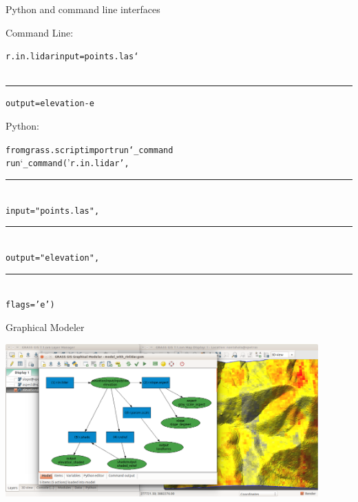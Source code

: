 \documentclass[xcolor={dvipsnames,usenames},beamer,aspectratio=169]{beamer}
\begin{document}
\begin{frame}{Python and command line interfaces}


\Large

Command Line:

\LARGE

\begin{alltt}
\textcolor{mod}{r.in.lidar} \textcolor{opt}{input}=\textcolor{txt}{points.las} \textcolor{bash}{\char`\\}
\\%
\newlength{\shindent}
\settowidth{\shindent}{r.in.lidar~}
\rule{\shindent}{0pt}%
\textcolor{opt}{output}=\textcolor{txt}{elevation} -\textcolor{flg}{e}
\end{alltt}

\Large

Python:


\LARGE

\begin{alltt}
\textcolor{import}{from grass.script import run\char`_command}
\\
run\char`_command('\textcolor{mod}{r.in.lidar}',
%
\newlength{\pyindent}%
\settowidth{\pyindent}{run\_command(}%
\\%
\rule{\pyindent}{0pt}\,%
\textcolor{opt}{input}="\textcolor{txt}{points.las}",
\\%
\rule{\pyindent}{0pt}\,%
\textcolor{opt}{output}="\textcolor{txt}{elevation}",
\\%
\rule{\pyindent}{0pt}\,%
flags='\textcolor{flg}{e}')
\end{alltt}

\end{frame}


\begin{frame}{Graphical Modeler}

\begin{center}
  \includegraphics[width=0.9\textwidth]{grass/modeler}
\end{center}

\end{frame}
\end{document}
